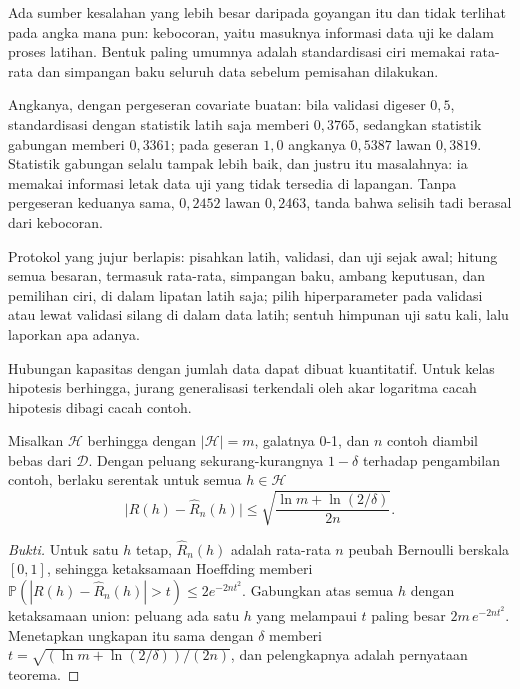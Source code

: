 Ada sumber kesalahan yang lebih besar daripada goyangan itu dan tidak terlihat pada angka
mana pun: kebocoran, yaitu masuknya informasi data uji ke dalam proses latihan. Bentuk
paling umumnya adalah standardisasi ciri memakai rata-rata dan simpangan baku seluruh data
sebelum pemisahan dilakukan.

Angkanya, dengan pergeseran covariate buatan: bila validasi digeser $0{,}5$,
standardisasi dengan statistik latih saja memberi $0{,}3765$, sedangkan statistik
gabungan memberi $0{,}3361$; pada geseran $1{,}0$ angkanya $0{,}5387$ lawan $0{,}3819$.
Statistik gabungan selalu tampak lebih baik, dan justru itu masalahnya: ia memakai
informasi letak data uji yang tidak tersedia di lapangan. Tanpa pergeseran keduanya sama,
$0{,}2452$ lawan $0{,}2463$, tanda bahwa selisih tadi berasal dari kebocoran.

Protokol yang jujur berlapis: pisahkan latih, validasi, dan uji sejak awal; hitung
semua besaran, termasuk rata-rata, simpangan baku, ambang keputusan, dan pemilihan ciri,
di dalam lipatan latih saja; pilih hiperparameter pada validasi atau lewat validasi
silang di dalam data latih; sentuh himpunan uji satu kali, lalu laporkan apa adanya.

Hubungan kapasitas dengan jumlah data dapat dibuat kuantitatif. Untuk kelas hipotesis
berhingga, jurang generalisasi terkendali oleh akar logaritma cacah hipotesis dibagi
cacah contoh.

\begin{teorema}
Misalkan $\mathcal{H}$ berhingga dengan $|\mathcal{H}|=m$, galatnya 0-1, dan $n$ contoh
diambil bebas dari $\mathcal{D}$. Dengan peluang sekurang-kurangnya $1-\delta$ terhadap
pengambilan contoh, berlaku serentak untuk semua $h\in\mathcal{H}$
\[
\bigl|R(h)-\hat R_n(h)\bigr|\le\sqrt{\frac{\ln m+\ln(2/\delta)}{2n}} .
\]
\end{teorema}

\begin{proof}[Bukti]
Untuk satu $h$ tetap, $\hat R_n(h)$ adalah rata-rata $n$ peubah Bernoulli berskala
$[0,1]$, sehingga ketaksamaan Hoeffding memberi
$\mathbb{P}(|R(h)-\hat R_n(h)|>t)\le2e^{-2nt^2}$. Gabungkan atas semua $h$ dengan
ketaksamaan union: peluang ada satu $h$ yang melampaui $t$ paling besar
$2m\,e^{-2nt^2}$. Menetapkan ungkapan itu sama dengan $\delta$ memberi
$t=\sqrt{(\ln m+\ln(2/\delta))/(2n)}$, dan pelengkapnya adalah pernyataan teorema.
\end{proof}

